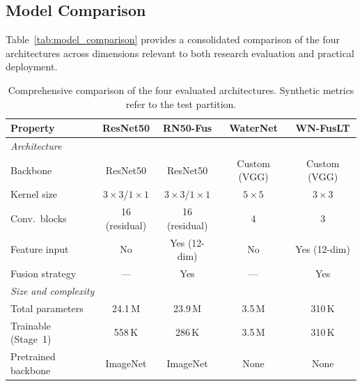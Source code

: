 \subsection{Model Comparison}
\label{subsec:model_comparison}

Table~\ref{tab:model_comparison} provides a consolidated comparison of the four architectures across dimensions relevant to both research evaluation and practical deployment.

\begin{table}[htbp]
    \caption{Comprehensive comparison of the four evaluated architectures. Synthetic metrics refer to the test partition.}
    \begin{center}
        \small
        \begin{tabular}{|l|c|c|c|c|}
        \hline
        \textbf{Property}
            & \textbf{ResNet50}
            & \textbf{RN50-Fus}
            & \textbf{WaterNet}
            & \textbf{WN-FusLT} \\
        \hline
        \multicolumn{5}{|l|}{\textit{Architecture}} \\
        \hline
        Backbone
            & ResNet50
            & ResNet50
            & Custom (VGG)
            & Custom (VGG) \\
        Kernel size
            & $3\times3$/$1\times1$
            & $3\times3$/$1\times1$
            & $5\times5$
            & $3\times3$ \\
        Conv.\ blocks
            & 16 (residual)
            & 16 (residual)
            & 4
            & 3 \\
        Feature input
            & No
            & Yes (12-dim)
            & No
            & Yes (12-dim) \\
        Fusion strategy
            & ---
            & Yes
            & ---
            & Yes \\
        \hline
        \multicolumn{5}{|l|}{\textit{Size and complexity}} \\
        \hline
        Total parameters
            & 24.1\,M
            & 23.9\,M
            & 3.5\,M
            & 310\,K \\
        Trainable (Stage~1)
            & 558\,K
            & 286\,K
            & 3.5\,M
            & 310\,K \\
        Pretrained backbone
            & ImageNet
            & ImageNet
            & None
            & None \\
        \hline

\end{tabular}
\end{center}
\end{table}
